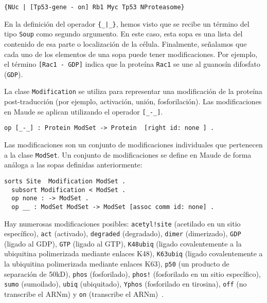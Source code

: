 \begin{lstlisting}[language=Maude]
 {NUc | [Tp53-gene - on] Rb1 Myc Tp53 NProteasome}
\end{lstlisting}
\medskip

En la definición del operador \verb${_|_}$, hemos visto que se recibe un término del tipo \texttt{Soup} como segundo argumento. En este caso, esta sopa es una lista del contenido de esa parte o localización de la célula. Finalmente, señalamos que cada uno de los elementos de una sopa puede tener modificaciones. Por ejemplo, el término \texttt{[Rac1 - GDP]} indica que la proteína \texttt{Rac1} se une al guanosín difosfato (\texttt{GDP}). 

La clase \texttt{Modification} se utiliza para representar una modificación de la proteína post-traducción (por ejemplo, activación, unión, fosforilación). Las modificaciones en Maude se aplican utilizando el operador \verb$[_-_]$.

\begin{lstlisting}[language=Maude]
  op [_-_] : Protein ModSet -> Protein  [right id: none ] .
\end{lstlisting}

\noindent%
Las modificaciones son un conjunto de modificaciones individuales que pertenecen a la clase \texttt{ModSet}. Un conjunto de modificaciones se define en Maude de forma análoga a las sopas definidas anteriormente:

\begin{lstlisting}[language=Maude,caption={Conjunto de modificaciones en Maude
},label=lst:SoupModifications]
  sorts Site  Modification ModSet .
  subsort Modification < ModSet . 
  op none : -> ModSet . 
  op __ : ModSet ModSet -> ModSet [assoc comm id: none] . 
\end{lstlisting}

Hay numerosas modificaciones posibles: \verb$acetyl!site$ (acetilado en un sitio específico), \verb$act$ (activado), \verb$degraded$ (degradado), \verb$dimer$ (dimerizado), \verb$GDP$ (ligado al GDP), \verb$GTP$ (ligado al GTP), \verb$K48ubiq$ (ligado covalentemente a la ubiquitina polimerizada mediante enlaces K48), \verb$K63ubiq$ (ligado covalentemente a la ubiquitina polimerizada mediante enlaces K63), \verb$p50$ (un producto de separación de 50kD), \verb$phos$ (fosforilado), \verb$phos!$ (fosforilado en un sitio específico), \verb$sumo$ (sumoilado), \verb$ubiq$ (ubiquitado), \verb$Yphos$ (fosforilado en tirosina), \verb$off$ (no transcribe el ARNm) y \verb$on$ (transcribe el ARNm)~\citep{DBLP:conf/bibm/Talcott16}. 

